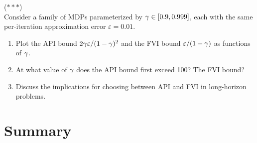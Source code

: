 \documentclass[11pt,a4paper]{article}
\begin{document}
\begin{exercise}
\textnormal{(\(***\))} \\
Consider a family of MDPs parameterized by $\gamma \in [0.9, 0.999]$,
each with the same per-iteration approximation error $\varepsilon = 0.01$.
\begin{enumerate}[nosep]
  \item[(a)] Plot the API bound
    $2\gamma\varepsilon/(1-\gamma)^2$ and the FVI bound
    $\varepsilon/(1-\gamma)$ as functions of $\gamma$.
  \item[(b)] At what value of $\gamma$ does the API bound first
    exceed 100? The FVI bound?
  \item[(c)] Discuss the implications for choosing between API and
    FVI in long-horizon problems.
\end{enumerate}
\end{exercise}

\section{Summary}
\label{sec:summary}
\end{document}
